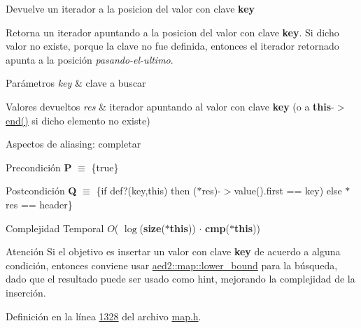 Devuelve un iterador a la posicion del valor con clave {\bfseries key} 

Retorna un iterador apuntando a la posicion del valor con clave {\bfseries key}. Si dicho valor no existe, porque la clave no fue definida, entonces el iterador retornado apunta a la posición {\itshape pasando-\/el-\/ultimo}.


\begin{DoxyParams}{Parámetros}
{\em key} & clave a buscar \\
\hline
\end{DoxyParams}

\begin{DoxyRetVals}{Valores devueltos}
{\em res} & iterador apuntando al valor con clave {\bfseries key} (o a {\bfseries this}-\/$>$\hyperlink{classaed2_1_1map_a76023e6a56cb625513e1b5ea028bf983_a76023e6a56cb625513e1b5ea028bf983}{end()} si dicho elemento no existe)\\
\hline
\end{DoxyRetVals}
\begin{DoxyParagraph}{Aspectos de aliasing\+:}
completar
\end{DoxyParagraph}
\begin{DoxyPrecond}{Precondición}
{\bfseries P} $\equiv$ \{true\} 
\end{DoxyPrecond}
\begin{DoxyPostcond}{Postcondición}
{\bfseries Q} $\equiv$ \{if def?(key,this) then ($\ast$res)-\/$>$value().first == key) else $\ast$res == header\}
\end{DoxyPostcond}

\begin{DoxyDescription}
\item[Complejidad Temporal]$O$( $\log$({\bfseries size}({\bfseries $\ast$this})) $\cdot$ {\bfseries cmp}({\bfseries $\ast$this}))
\end{DoxyDescription}

\begin{DoxyAttention}{Atención}
Si el objetivo es insertar un valor con clave {\bfseries key} de acuerdo a alguna condición, entonces conviene usar \hyperlink{classaed2_1_1map_a62075a47afdf89267c5462f88164af3d_a62075a47afdf89267c5462f88164af3d}{aed2\+::map\+::lower\+\_\+bound} para la búsqueda, dado que el resultado puede ser usado como hint, mejorando la complejidad de la inserción. 
\end{DoxyAttention}


Definición en la línea \hyperlink{map_8h_source_l01328}{1328} del archivo \hyperlink{map_8h_source}{map.\+h}.

